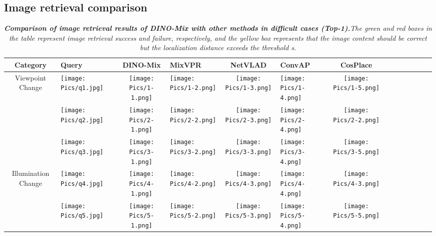 \subsection{Image retrieval comparison} 
\label{image retrieval conparision}

            \begin{table*}[!t]
    \renewcommand{\thetable}{4}
    \caption{\emph{\textbf{Comparison of image retrieval results of DINO-Mix with other methods in difficult cases (Top-1).}The green and red boxes in the table represent image retrieval success and failure, respectively, and the yellow box represents that the image content should be correct but the localization distance exceeds the threshold s.}}
    \centering
    \begin{tabular}{c p{2cm} c p{2cm} c p{2cm} c p{2cm} c p{2cm} c p{2cm} c p{2cm}}
    \hline
    Category&Query&DINO-Mix&MixVPR&NetVLAD&ConvAP&CosPlace\\
    \hline
    Viewpoint Change&\texttt{[image: Pics/q1.jpg]}& \texttt{[image: Pics/1-1.png]}&\texttt{[image: Pics/1-2.png]}&\texttt{[image: Pics/1-3.png]}&\texttt{[image: Pics/1-4.png]}&\texttt{[image: Pics/1-5.png]} \\
     &\texttt{[image: Pics/q2.jpg]}& \texttt{[image: Pics/2-1.png]}&\texttt{[image: Pics/2-2.png]}&\texttt{[image: Pics/2-3.png]}&\texttt{[image: Pics/2-4.png]}&\texttt{[image: Pics/2-2.png]} \\
     \hline
     &\texttt{[image: Pics/q3.jpg]}& \texttt{[image: Pics/3-1.png]}&\texttt{[image: Pics/3-2.png]}&\texttt{[image: Pics/3-3.png]}&\texttt{[image: Pics/3-4.png]}&\texttt{[image: Pics/3-5.png]} \\
    Illumination Change&\texttt{[image: Pics/q4.jpg]}& \texttt{[image: Pics/4-1.png]}&\texttt{[image: Pics/4-2.png]}&\texttt{[image: Pics/4-3.png]}&\texttt{[image: Pics/4-4.png]}&\texttt{[image: Pics/4-3.png]} \\
    &\texttt{[image: Pics/q5.jpg]}& \texttt{[image: Pics/5-1.png]}&\texttt{[image: Pics/5-2.png]}&\texttt{[image: Pics/5-3.png]}&\texttt{[image: Pics/5-4.png]}&\texttt{[image: Pics/5-5.png]} \\

\end{tabular}
\end{table*}
